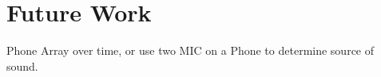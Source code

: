 \section{Future Work}
\label{sec:future}


Phone Array over time, or use two MIC on a Phone to determine source of sound.